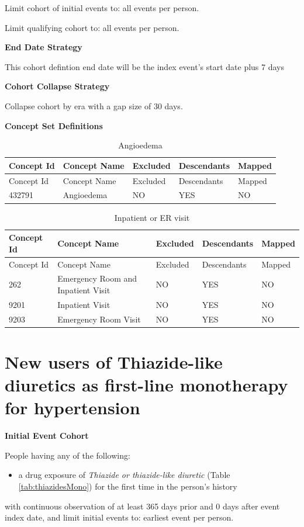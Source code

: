 \documentclass[11pt]{book}
\providecommand{\tightlist}{%
  \setlength{\itemsep}{0pt}\setlength{\parskip}{0pt}}
\begin{document}
Limit cohort of initial events to: all events per person.

Limit qualifying cohort to: all events per person.

\textbf{End Date Strategy}

This cohort defintion end date will be the index event's start date plus
7 days

\textbf{Cohort Collapse Strategy}

Collapse cohort by era with a gap size of 30 days.

\textbf{Concept Set Definitions}

\begin{longtable}[]{@{}lllll@{}}
\caption{\label{tab:angioedema} Angioedema}\tabularnewline
\toprule
Concept Id & Concept Name & Excluded & Descendants &
Mapped\tabularnewline
\midrule
\endfirsthead
\toprule
Concept Id & Concept Name & Excluded & Descendants &
Mapped\tabularnewline
\midrule
\endhead
432791 & Angioedema & NO & YES & NO\tabularnewline
\bottomrule
\end{longtable}

\begin{longtable}[]{@{}lllll@{}}
\caption{\label{tab:inpatientOrEr} Inpatient or ER visit}\tabularnewline
\toprule
Concept Id & Concept Name & Excluded & Descendants &
Mapped\tabularnewline
\midrule
\endfirsthead
\toprule
Concept Id & Concept Name & Excluded & Descendants &
Mapped\tabularnewline
\midrule
\endhead
262 & Emergency Room and Inpatient Visit & NO & YES & NO\tabularnewline
9201 & Inpatient Visit & NO & YES & NO\tabularnewline
9203 & Emergency Room Visit & NO & YES & NO\tabularnewline
\bottomrule
\end{longtable}

\section{New users of Thiazide-like diuretics as first-line monotherapy
for hypertension}\label{ThiazidesMono}

\textbf{Initial Event Cohort}

People having any of the following:

\begin{itemize}
\tightlist
\item
  a drug exposure of \emph{Thiazide or thiazide-like diuretic} (Table
  \ref{tab:thiazidesMono}) for the first time in the person's history
\end{itemize}

with continuous observation of at least 365 days prior and 0 days after
event index date, and limit initial events to: earliest event per
person.
\end{document}
